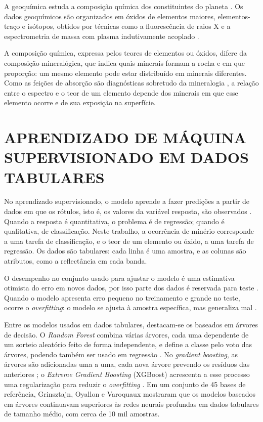 A geoquímica estuda a composição química dos constituintes do planeta \cite{winge2018b}. Os dados geoquímicos são organizados em óxidos de elementos maiores, elementos-traço e isótopos, obtidos por técnicas como a fluorescência de raios X e a espectrometria de massa com plasma indutivamente acoplado \cite{rollinson2021}.

A composição química, expressa pelos teores de elementos ou óxidos, difere da composição mineralógica, que indica quais minerais formam a rocha e em que proporção: um mesmo elemento pode estar distribuído em minerais diferentes. Como as feições de absorção são diagnósticas sobretudo da mineralogia \cite{clark1999}, a relação entre o espectro e o teor de um elemento depende dos minerais em que esse elemento ocorre e de sua exposição na superfície.

\section{APRENDIZADO DE MÁQUINA SUPERVISIONADO EM DADOS TABULARES}

No aprendizado supervisionado, o modelo aprende a fazer predições a partir de dados em que os rótulos, isto é, os valores da variável resposta, são observados \cite{izbicki2020}. Quando a resposta é quantitativa, o problema é de regressão; quando é qualitativa, de classificação. Neste trabalho, a ocorrência de minério corresponde a uma tarefa de classificação, e o teor de um elemento ou óxido, a uma tarefa de regressão. Os dados são tabulares: cada linha é uma amostra, e as colunas são atributos, como a reflectância em cada banda.

O desempenho no conjunto usado para ajustar o modelo é uma estimativa otimista do erro em novos dados, por isso parte dos dados é reservada para teste \cite{izbicki2020,james2013}. Quando o modelo apresenta erro pequeno no treinamento e grande no teste, ocorre o \textit{overfitting}: o modelo se ajusta à amostra específica, mas generaliza mal \cite{james2013}.

Entre os modelos usados em dados tabulares, destacam-se os baseados em árvores de decisão. O \textit{Random Forest} combina várias árvores, cada uma dependente de um sorteio aleatório feito de forma independente, e define a classe pelo voto das árvores, podendo também ser usado em regressão \cite{breiman2001}. No \textit{gradient boosting}, as árvores são adicionadas uma a uma, cada nova árvore prevendo os resíduos das anteriores \cite{izbicki2020}; o \textit{Extreme Gradient Boosting} (XGBoost) acrescenta a esse processo uma regularização para reduzir o \textit{overfitting} \cite{chen2016}. Em um conjunto de 45 bases de referência, Grinsztajn, Oyallon e Varoquaux \cite{grinsztajn2022} mostraram que os modelos baseados em árvores continuavam superiores às redes neurais profundas em dados tabulares de tamanho médio, com cerca de 10 mil amostras.

